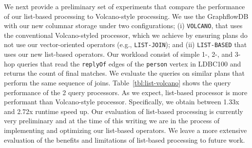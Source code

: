 We next provide a preliminary set of experiments that compare the performance of our list-based processing to Volcano-style processing. We use the GraphflowDB with our new columnar storage under two configurations; (i) \texttt{VOLCANO}, that uses the conventional Volcano-styled processor, which we achieve by ensuring plans do not use our vector-oriented operators (e.g., \texttt{LIST-JOIN}); and (ii) \texttt{LIST-BASED} that uses our new list-based operators. Our workload consist of simple 1-, 2-, and 3-hop queries that read the \texttt{replyOf} edges of the \texttt{person} vertex in LDBC100 and returns the count of final matches. We evaluate the queries on similar plans that perform the same sequence of joins.
Table~\ref{tbl:list-volcano} shows the query performance of the 2 query processors. As we expect, list-based processor is more performant than Volcano-style processor. Specifically, we obtain between 1.33x and 2.72x runtime speed up. Our evaluation of list-based processing is currently very preliminary and at the time of this writing we are in the process of implementing and optimizing our list-based operators. We leave a more extensive evaluation of the benefits and limitations of list-based processing to future work.

